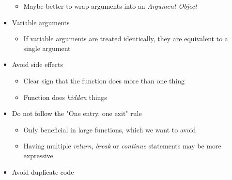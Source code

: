 \begin{itemize}
\begin{itemize}
        \item Maybe better to wrap arguments into an \textit{Argument Object}
    \end{itemize}
    \item Variable arguments
    \begin{itemize}
        \item If variable arguments are treated identically, they are equivalent to a single argument
    \end{itemize}
    \item Avoid side effects
    \begin{itemize}
        \item Clear sign that the function does more than one thing
        \item Function does \textit{hidden} things
    \end{itemize}
    \item Do not follow the "One entry, one exit" rule
    \begin{itemize}
        \item Only beneficial in large functions, which we want to avoid
        \item Having multiple \textit{return}, \textit{break} or \textit{continue} statements may be more expressive
    \end{itemize}
    \item Avoid duplicate code
\end{itemize}
